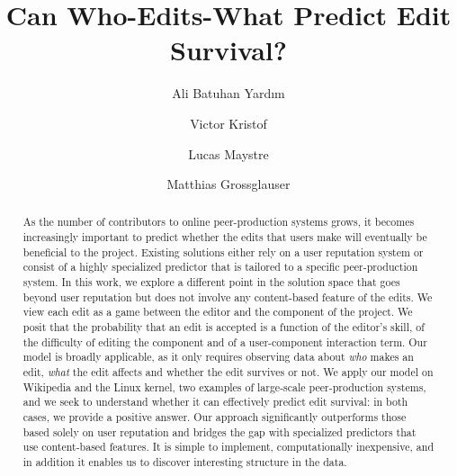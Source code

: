 \documentclass[format=sigconf]{acmart}
\begin{document}
\title{Can Who-Edits-What Predict Edit Survival?}


\author{Ali Batuhan Yardım}

\author{Victor Kristof}

\author{Lucas Maystre}

\author{Matthias Grossglauser}

\renewcommand{\shortauthors}{B. Yardım et al.}

\begin{abstract}
As the number of contributors to online peer-production systems grows, it becomes increasingly important to predict whether the edits that users make will eventually be beneficial to the project.
Existing solutions either rely on a user reputation system or consist of a highly specialized predictor that is tailored to a specific peer-production system.
In this work, we explore a different point in the solution space that goes beyond user reputation but does not involve any content-based feature of the edits.
We view each edit as a game between the editor and the component of the project.
We posit that the probability that an edit is accepted is a function of the editor's skill, of the difficulty of editing the component and of a user-component interaction term.
Our model is broadly applicable, as it only requires observing data about \emph{who} makes an edit, \emph{what} the edit affects and whether the edit survives or not.
We apply our model on Wikipedia and the Linux kernel, two examples of large-scale peer-production systems, and we seek to understand whether it can effectively predict edit survival:
in both cases, we provide a positive answer.
Our approach significantly outperforms those based solely on user reputation and bridges the gap with specialized predictors that use content-based features.
It is simple to implement, computationally inexpensive, and in addition it enables us to discover interesting structure in the data.

\end{abstract}
\end{document}
